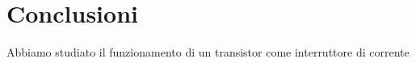 \section{Conclusioni}

Abbiamo studiato il funzionamento di un transistor come interruttore di corrente 